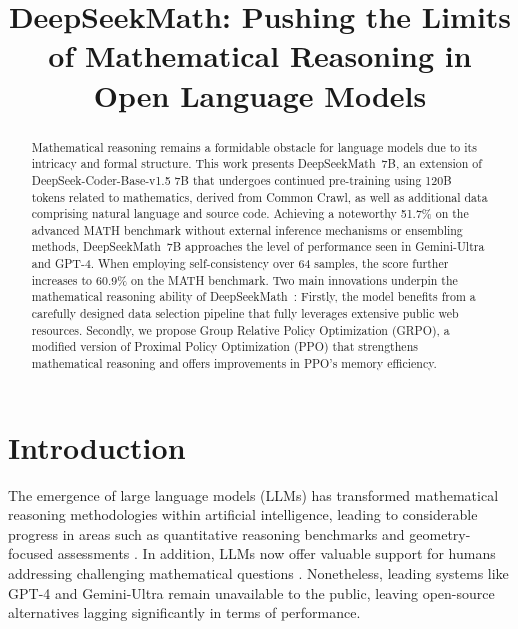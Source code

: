 \title{DeepSeekMath: Pushing the Limits of Mathematical Reasoning in Open Language Models}

\begin{abstract}
Mathematical reasoning remains a formidable obstacle for language models due to its intricacy and formal structure. This work presents DeepSeekMath~7B, an extension of DeepSeek-Coder-Base-v1.5 7B that undergoes continued pre-training using 120B tokens related to mathematics, derived from Common Crawl, as well as additional data comprising natural language and source code. Achieving a noteworthy 51.7\% on the advanced MATH benchmark without external inference mechanisms or ensembling methods, DeepSeekMath~7B approaches the level of performance seen in Gemini-Ultra and GPT-4. When employing self-consistency over 64 samples, the score further increases to 60.9\% on the MATH benchmark. Two main innovations underpin the mathematical reasoning ability of DeepSeekMath~: Firstly, the model benefits from a carefully designed data selection pipeline that fully leverages extensive public web resources. Secondly, we propose Group Relative Policy Optimization (GRPO), a modified version of Proximal Policy Optimization (PPO) that strengthens mathematical reasoning and offers improvements in PPO's memory efficiency.
\end{abstract}

\section{Introduction}

The emergence of large language models (LLMs) has transformed mathematical reasoning methodologies within artificial intelligence, leading to considerable progress in areas such as quantitative reasoning benchmarks \citep{MATH} and geometry-focused assessments \citep{trinh2024solving}. In addition, LLMs now offer valuable support for humans addressing challenging mathematical questions \citep{tao}. Nonetheless, leading systems like GPT-4 \citep{gpt4} and Gemini-Ultra \citep{gemini} remain unavailable to the public, leaving open-source alternatives lagging significantly in terms of performance.

